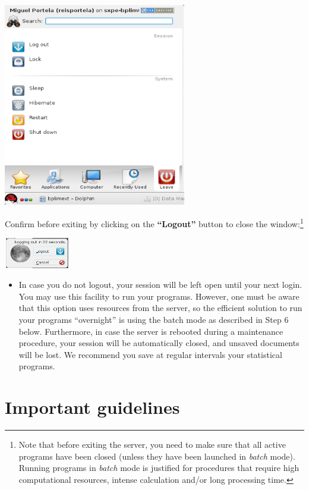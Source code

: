 \documentclass[
  11pt,
  a4paper,
]{article}
\providecommand{\tightlist}{%
  \setlength{\itemsep}{0pt}\setlength{\parskip}{0pt}}
\begin{document}
\includegraphics[width=3.14961in,height=3.50521in]{./media/image7.png}

Confirm before exiting by clicking on the \textbf{``Logout''} button to
close the window:\footnote{Note that before exiting the server, you need
  to make sure that all active programs have been closed (unless they
  have been launched in \emph{batch} mode). Running programs in
  \emph{batch} mode is justified for procedures that require high
  computational resources, intense calculation and/or long processing
  time.}

\includegraphics[width=1.14236in,height=0.52288in]{./media/image8.png}

\begin{itemize}
\tightlist
\item
  In case you do not logout, your session will be left open until your
  next login. You may use this facility to run your programs. However,
  one must be aware that this option uses resources from the server, so
  the efficient solution to run your programs ``overnight'' is using the
  batch mode as described in Step 6 below. Furthermore, in case the
  server is rebooted during a maintenance procedure, your session will
  be automatically closed, and unsaved documents will be lost. We
  recommend you save at regular intervals your statistical programs.
\end{itemize}

\pagebreak

\hypertarget{important-guidelines}{%
\section{Important guidelines}\label{important-guidelines}}
\end{document}
